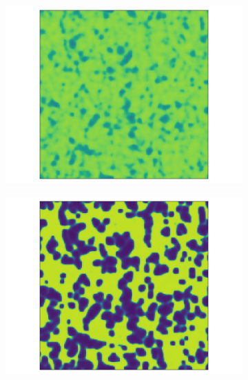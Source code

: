 \documentclass[../main.tex]{subfiles}
\begin{document}
\begin{figure}[H]
\begin{subfigure}[b]{0.11\textwidth}
        \includegraphics[keepaspectratio, width = \linewidth]{../figures/fig3.9.2.5.png}
    \end{subfigure}
    \hfill
    \begin{subfigure}[b]{0.11\textwidth}
        \centering 
        \includegraphics[keepaspectratio, width = \linewidth]{../figures/fig3.9.2.6.png}
    \end{subfigure}
    \hfill
    \begin{subfigure}[b]{0.11\textwidth}
        \centering 

\end{subfigure}
\end{figure}
\end{document}
